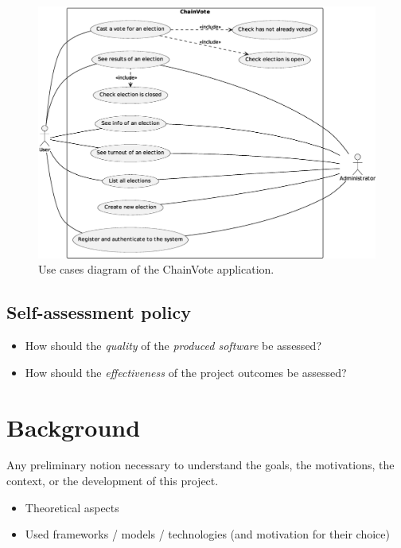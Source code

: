 \documentclass{scrartcl}
\begin{document}
\begin{figure}
    \centering
    \includegraphics[width=\linewidth]{figures/use-cases.eps}
    \caption{Use cases diagram of the ChainVote application.}
    \label{fig:use-cases-diagram} 
\end{figure}

\subsection{Self-assessment policy}

\begin{itemize}
    \item How should the \emph{quality} of the \emph{produced software} be assessed?
    
    \item How should the \emph{effectiveness} of the project outcomes be assessed?
\end{itemize}

\section{Background}

Any preliminary notion necessary to understand the goals, the motivations, the context, or the development of this project.
%
\begin{itemize}
    \item Theoretical aspects
    
    \item Used frameworks / models / technologies (and motivation for their choice)
\end{itemize}
\end{document}
